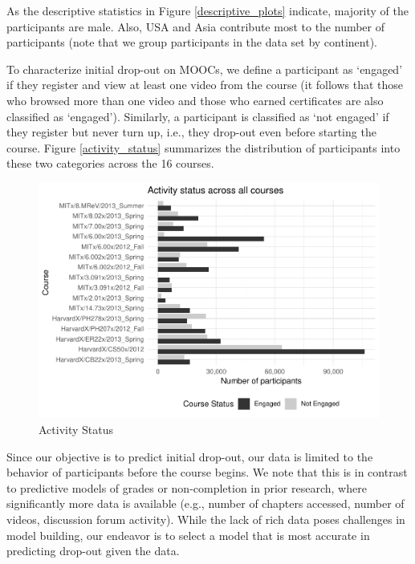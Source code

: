 \documentclass[12pt,]{article}
\begin{document}
As the descriptive statistics in Figure \ref{descriptive_plots}
indicate, majority of the participants are male. Also, USA and Asia
contribute most to the number of participants (note that we group
participants in the data set by continent).

To characterize initial drop-out on MOOCs, we define a participant as
`engaged' if they register and view at least one video from the course
(it follows that those who browsed more than one video and those who
earned certificates are also classified as `engaged'). Similarly, a
participant is classified as `not engaged' if they register but never
turn up, i.e., they drop-out even before starting the course. Figure
\ref{activity_status} summarizes the distribution of participants into
these two categories across the 16 courses.

\begin{figure}[p]

{\centering \includegraphics[width=1\linewidth,height=1\textheight]{initial-draft_files/figure-latex/unnamed-chunk-6-1} 

}

\caption{Activity Status \label{activity_status}}\label{fig:unnamed-chunk-6}
\end{figure}

Since our objective is to predict initial drop-out, our data is limited
to the behavior of participants before the course begins. We note that
this is in contrast to predictive models of grades or non-completion in
prior research, where significantly more data is available (e.g., number
of chapters accessed, number of videos, discussion forum activity).
While the lack of rich data poses challenges in model building, our
endeavor is to select a model that is most accurate in predicting
drop-out given the data.
\end{document}
